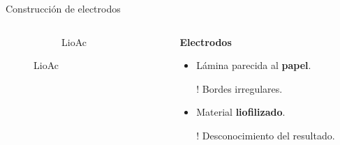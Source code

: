 \documentclass[aspectratio=169]{beamer}
\newcommand{\mLiofilizadoAcero}{LioAc }
\begin{document}
\begin{frame}{Construcción de electrodos}
\begin{columns}
\begin{column}{0.3\textwidth}
\begin{figure}
{\begin{subfigure}[b]{\electrodesWidth}
						\caption{\mLiofilizadoAcero}
					\end{subfigure}}
				\end{figure}
			\end{column}
			\begin{column}{0.6\textwidth}
				\textbf{Electrodos}
				\begin{itemize}[<+(1)->]
					\item Lámina parecida al \textbf{papel}.
					\item[!] Bordes irregulares.
					\item Material \textbf{liofilizado}.
					\item[!] Desconocimiento del resultado.
				\end{itemize}
			\end{column}
		\end{columns}		
	\end{frame}
\end{document}
